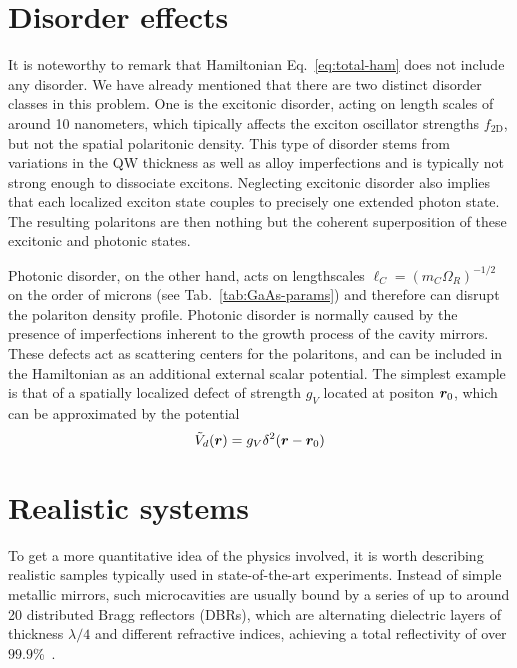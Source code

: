 \section{Disorder effects}
\label{sec:disorder}


It is noteworthy to remark that Hamiltonian Eq.~\eqref{eq:total-ham}
does not include any disorder. We have already mentioned that there
are two distinct disorder classes in this problem. One is the
excitonic disorder, acting on length scales of around 10 nanometers,
which tipically affects the exciton oscillator strengths
$f_{\text{2D}}$, but not the spatial polaritonic density. This type of
disorder stems from variations in the QW thickness as well as alloy
imperfections and is typically not strong enough to dissociate
excitons. Neglecting excitonic disorder also implies that each
localized exciton state couples to precisely one extended photon
state. The resulting polaritons are then nothing but the coherent
superposition of these excitonic and photonic states.

Photonic disorder, on the other hand, acts on lengthscales
$\ell_{C} = (m_{C}\Omega_R)^{-1/2}$ on the order of microns (see
Tab.~\ref{tab:GaAs-params}) and therefore can disrupt the polariton
density profile. Photonic disorder is normally caused by the presence
of imperfections inherent to the growth process of the cavity
mirrors. These defects act as scattering centers for the polaritons,
and can be included in the Hamiltonian as an additional external
scalar potential. The simplest example is that of a spatially
localized defect of strength $g_V$ located at positon $\bm{r}_0$, which
can be approximated by the potential
%
\begin{equation}\label{eq:defect-pot}
  \tilde{V}_d(\bm{r}) = g_V \delta^2(\bm{r} - \bm{r}_0)
\end{equation}
% 

\section{Realistic systems}
\label{sec:realistic}

To get a more quantitative idea of the physics involved, it is worth
describing realistic samples typically used in state-of-the-art
experiments. Instead of simple metallic mirrors, such microcavities
are usually bound by a series of up to around 20 distributed Bragg
reflectors (DBRs), which are alternating dielectric layers of
thickness $\lambda/4$ and different refractive indices, achieving a
total reflectivity of over $99.9$\%~\cite{9780199228942}. 

